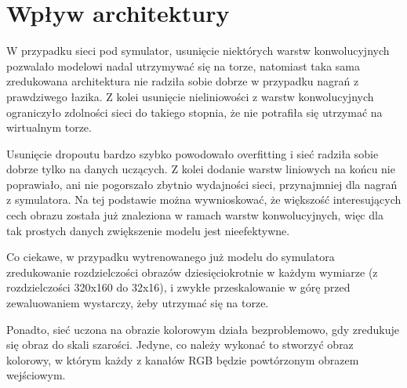 \section{Wpływ architektury}
W przypadku sieci pod symulator, usunięcie niektórych warstw konwolucyjnych
pozwalało modelowi nadal utrzymywać się na torze, natomiast taka sama zredukowana architektura 
nie radziła sobie dobrze w przypadku nagrań z prawdziwego łazika. Z kolei
usunięcie nieliniowości z warstw konwolucyjnych ograniczyło zdolności sieci do takiego stopnia,
że nie potrafiła się utrzymać na wirtualnym torze.

Usunięcie dropoutu bardzo szybko powodowało overfitting i sieć radziła sobie
dobrze tylko na danych uczących. Z kolei dodanie warstw liniowych na końcu nie 
poprawiało, ani nie pogorszało zbytnio wydajności sieci, przynajmniej dla
nagrań z symulatora. Na tej podstawie można wywnioskować, że większość interesujących 
cech obrazu została już znaleziona w ramach warstw konwolucyjnych, więc dla tak prostych danych zwiększenie modelu jest nieefektywne.

Co ciekawe, w przypadku wytrenowanego już modelu do symulatora zredukowanie 
rozdzielczości obrazów dziesięciokrotnie w każdym wymiarze (z rozdzielczości 
320x160 do 32x16),
i zwykłe przeskalowanie w górę przed zewaluowaniem wystarczy, żeby utrzymać się 
na torze.

Ponadto, sieć uczona na obrazie kolorowym działa bezproblemowo, gdy
zredukuje się obraz do skali szarości. Jedyne, co należy wykonać to stworzyć obraz kolorowy, w którym każdy z kanałów RGB będzie powtórzonym obrazem wejściowym.


